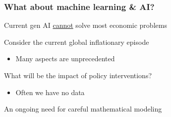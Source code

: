 \documentclass[
    xcolor={svgnames,dvipsnames},
    hyperref={colorlinks, citecolor=DeepPink4, linkcolor=DarkRed, urlcolor=DarkBlue}
    ]{beamer}  %
\newcommand{\1}{\mathbbm 1}
\begin{document}
\begin{frame}
    \frametitle{What about machine learning \& AI?}

    Current gen AI \underline{cannot} solve most economic problems

    \vspace{1em}
    Consider the current global inflationary episode

    \begin{itemize}
        \item Many aspects are unprecedented
    \end{itemize}

    \vspace{1em}
    What will be the impact of policy interventions?

    \begin{itemize}
        \item Often we have no data
    \end{itemize}

    
    \vspace{1em}
    An ongoing need for careful mathematical modeling
    
\end{frame}
\end{document}
